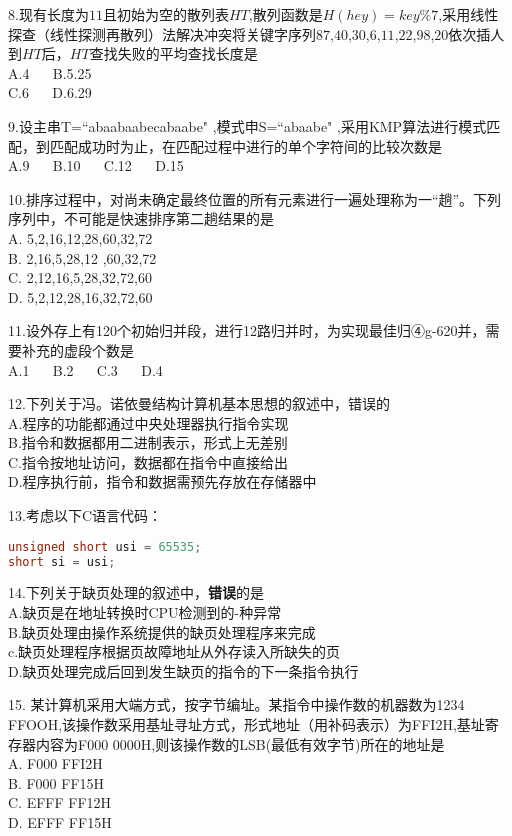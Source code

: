 8.现有长度为$11$且初始为空的散列表$HT$,散列函数是$H(hey)= key\%7$,采用线性探查（线性探测再散列）法解决冲突将关键字序列$87$,$40$,$30$,$6$,$11$,$22$,$98$,$20$依次插人到$HT$后，$HT$查找失败的平均查找长度是 \\
A.4 $\quad$ B.5.25 \\
C.6 $\quad$ D.6.29

9.设主串T=“abaabaabecabaabe" ,模式申S=“abaabe" ,采用KMP算法进行模式匹配，到匹配成功时为止，在匹配过程中进行的单个字符间的比较次数是 \\
A.9 $\quad$ B.10 $\quad$ C.12 $\quad$ D.15

10.排序过程中，对尚未确定最终位置的所有元素进行一遍处理称为一“趟”。下列序列中，不可能是快速排序第二趟结果的是 \\
A. 5,2,16,12,28,60,32,72 \\
B. 2,16,5,28,12 ,60,32,72 \\
C. 2,12,16,5,28,32,72,60 \\
D. 5,2,12,28,16,32,72,60

11.设外存上有120个初始归并段，进行12路归并时，为实现最佳归④g-620并，需要补充的虚段个数是 \\
A.1 $\quad$ B.2 $\quad$ C.3 $\quad$ D.4

12.下列关于冯。诺依曼结构计算机基本思想的叙述中，错误的 \\
A.程序的功能都通过中央处理器执行指令实现 \\
B.指令和数据都用二进制表示，形式上无差别 \\
C.指令按地址访问，数据都在指令中直接给出 \\
D.程序执行前，指令和数据需预先存放在存储器中

13.考虑以下C语言代码：
\begin{lstlisting}[language=cpp]
unsigned short usi = 65535;
short si = usi;
\end{lstlisting}

14.下列关于缺页处理的叙述中，\textbf{错误}的是 \\
A.缺页是在地址转换时CPU检测到的-种异常 \\
B.缺页处理由操作系统提供的缺页处理程序来完成 \\
c.缺页处理程序根据页故障地址从外存读入所缺失的页 \\
D.缺页处理完成后回到发生缺页的指令的下一条指令执行

15. 某计算机采用大端方式，按字节编址。某指令中操作数的机器数为1234 FFOOH,该操作数采用基址寻址方式，形式地址（用补码表示）为FFI2H,基址寄存器内容为F000 0000H,则该操作数的LSB(最低有效字节)所在的地址是 \\
A. F000 FFI2H \\
B. F000 FF15H \\
C. EFFF FF12H \\
D. EFFF FF15H

